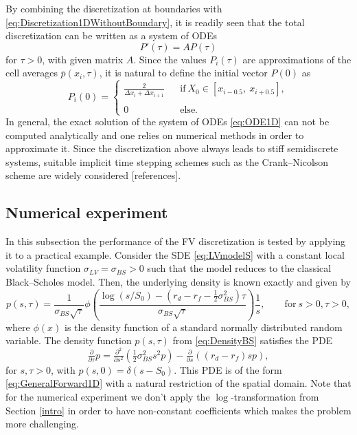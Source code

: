 \documentclass[10pt]{article}
\begin{document}
By combining the discretization at boundaries with \eqref{eq:Discretization1DWithoutBoundary}, it is readily seen that the total discretization can be written as a system of ODEs
\begin{equation}
P'(\tau) = A P(\tau)
\label{eq:ODE1D}
\end{equation} 
for $\tau > 0$, with given matrix $A$. 
Since the values $P_{i}(\tau)$ are approximations of the cell averages $\overline{p}(x_{i},\tau)$, it is natural to define the initial vector $P(0)$ as 
$$ P_{i}(0) = \left\{ \begin{array}{lll}
\tfrac{2}{\Delta x_{i} + \Delta x_{i+1}} & & \mathrm{if} \ X_{0} \in [x_{i-0.5}, \ x_{i+0.5}], \\\\
0 && \mathrm{else.}
\end{array} \right. $$
In general, the exact solution of the system of ODEs \eqref{eq:ODE1D} can not be computed analytically and one relies on numerical methods in order to approximate it. Since the discretization above always leads to stiff semidiscrete systems, suitable implicit time stepping schemes such as the Crank--Nicolson scheme are widely considered [references].

 

\subsection{Numerical experiment} \label{subsec:Experiment1D}

In this subsection the performance of the FV discretization is tested by applying it to a practical example. Consider the SDE \eqref{eq:LVmodelS} with a constant local volatility function $\sigma_{LV} = \sigma_{BS} > 0$ such that the model reduces to the classical Black--Scholes model. Then, the underlying density is known exactly and given by
\begin{equation}
p(s,\tau) = \frac{1}{\sigma_{BS}\sqrt{\tau}}\phi\left(\frac{\log(s/S_{0})-(r_{d}-r_{f}-\tfrac{1}{2}\sigma^{2}_{BS})\tau}{\sigma_{BS}\sqrt{\tau}}\right)\frac{1}{s}, \qquad \mathrm{for} \ s>0, \tau > 0,
\label{eq:DensityBS}
\end{equation}
where $\phi(x)$ is the density function of a standard normally distributed random variable.
The density function $p(s,\tau)$ from \eqref{eq:DensityBS} satisfies the PDE
$$ \tfrac{\partial}{\partial \tau} p = \tfrac{\partial^{2}}{\partial s^{2}} \left( \tfrac{1}{2} \sigma_{BS}^{2}s^{2}p \right) - \tfrac{\partial}{\partial s} \left( (r_{d} - r_{f})s p \right), $$
for $s, \tau > 0$, with $p(s,0)=\delta(s-S_{0})$. This PDE is of the form \eqref{eq:GeneralForward1D} with a natural restriction of the spatial domain. Note that for the numerical experiment we don't apply the $\log$-transformation from Section \ref{intro} in order to have non-constant coefficients which makes the problem more challenging.
\end{document}
